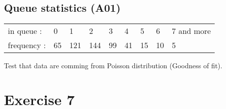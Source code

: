 \documentclass[4pt]{article}
\begin{document}
\subsection{Queue statistics (A01)}

\begin{tabular}{lllllllll}
in queue        : &0  &1   &2   &3  &4  &5  &6  &7 and more\\
frequency       : &65 &121 &144 &99 &41 &15 &10 &5
\end{tabular}
Test that data are comming from Poisson distribution (Goodness of fit).





\noindent
\pagebreak


\section{Exercise 7}

%
%  
%
%
%
%
%
%
%









 






% 
% 
%
% 
%
\end{document}
